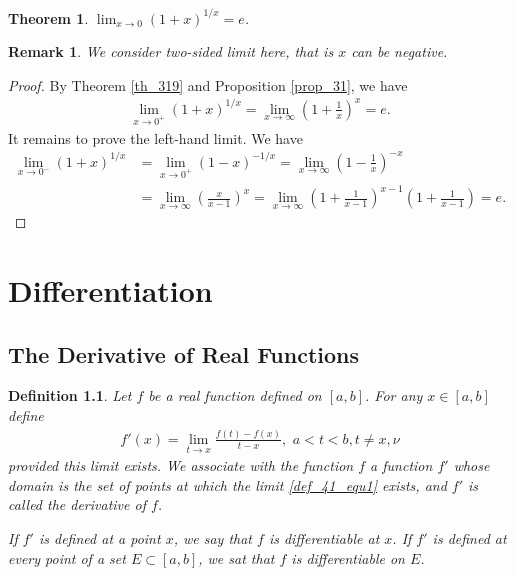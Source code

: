 \documentclass[10pt]{book}
\newtheorem{definition}{Definition}[chapter]
\newtheorem{theorem}{Theorem}[chapter]
\newtheorem{remark}{Remark}[chapter]
\theoremstyle{definition}
\numberwithin{equation}{chapter}
\begin{document}
\medskip

\begin{theorem}
$\lim_{x\to 0} \left(1 + x\right)^{1/x} = e$.
\end{theorem}

\begin{remark}
We consider two-sided limit here, that is $x$ can be negative.
\end{remark}

\begin{proof}
By Theorem \ref{th_319} and Proposition \ref{prop_31}, we have
\begin{align*}
    \lim_{x\to 0^+} \left(1 + x\right)^{1/x} = \lim_{x \to \infty} \left(1 + \frac{1}{x}\right)^{x} = e.
\end{align*}
It remains to prove the left-hand limit. We have
\begin{align*}
    \lim_{x\to 0^-} \left(1 + x\right)^{1/x} & = \lim_{x\to 0^+} \left(1 - x\right)^{-1/x} = \lim_{x\to \infty} \left(1 - \frac{1}{x}\right)^{-x} \\
    & = \lim_{x\to \infty} \left(\frac{x}{x-1}\right)^x = \lim_{x\to \infty} \left(1 + \frac{1}{x-1}\right)^{x-1} \left(1 + \frac{1}{x-1}\right) = e.
\end{align*}
\end{proof}








\chapter{Differentiation}

\section{The Derivative of Real Functions}

\begin{definition}\label{def_41}
Let $f$ be a real function defined on $[a,b]$. For any $x \in [a,b]$ define 
\begin{align}\label{def_41_equ1}
    f'(x) = \lim_{t \to x} \frac{f(t) - f(x)}{t - x}, \,\, a < t < b, t \neq x, \nu
\end{align}
provided this limit exists. We associate with the function $f$ a function $f'$ whose domain is the set of points at which the limit \eqref{def_41_equ1} exists, and $f'$ is called the derivative of $f$.

If $f'$ is defined at a point $x$, we say that $f$ is differentiable at $x$. If $f'$ is defined at every point of a set $E \subset [a,b]$, we sat that $f$ is differentiable on $E$.
\end{definition}
\end{document}
